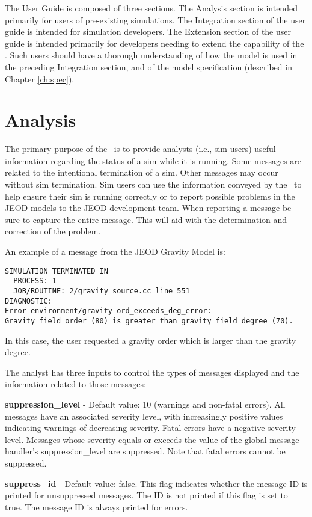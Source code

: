 The User Guide is composed of three sections. The Analysis section is 
intended primarily for users of pre-existing simulations.  
The Integration section of the user guide is intended for simulation developers.  
The Extension section of the user guide is intended primarily for developers 
needing to extend the capability of the \MessageHandlerDesc.  Such users 
should have a thorough understanding of how the model is used in the preceding 
Integration section, and of the model 
specification (described in Chapter \ref{ch:spec}).

\section{Analysis}
The primary purpose of the \MessageHandlerDesc\ is to provide analysts
(i.e., sim users) useful information regarding the status of a sim
while it is running. Some messages are related to the 
intentional termination of a sim. Other messages may occur without
sim termination. Sim users can use the information conveyed by the
\MessageHandlerDesc\ to help ensure their sim is running
correctly or to report possible problems in the JEOD models to 
the JEOD development team. When reporting a message be sure
to capture the entire message.  This will aid with the
determination and correction of the problem.

An example of a message from the JEOD Gravity Model is:
\begin{verbatim}
SIMULATION TERMINATED IN
  PROCESS: 1
  JOB/ROUTINE: 2/gravity_source.cc line 551
DIAGNOSTIC:
Error environment/gravity ord_exceeds_deg_error:
Gravity field order (80) is greater than gravity field degree (70).
\end{verbatim}
In this case, the user requested a gravity order which is larger
than the gravity degree. 

The analyst has three inputs to control the types of messages displayed
and the information related to those messages:

{\bf suppression\_level} - Default value: 10 (warnings and non-fatal errors).
All messages have an associated severity level, with increasingly positive
values indicating warnings of decreasing severity. Fatal errors have a
negative severity level. Messages whose severity equals or exceeds the
value of the global message handler's suppression\_level are suppressed.
Note that fatal errors cannot be suppressed.

{\bf suppress\_id} - Default value: false.
This flag indicates whether the message ID is printed for unsuppressed
messages. The ID is not printed if this flag is set to true.
The message ID is always printed for errors.

